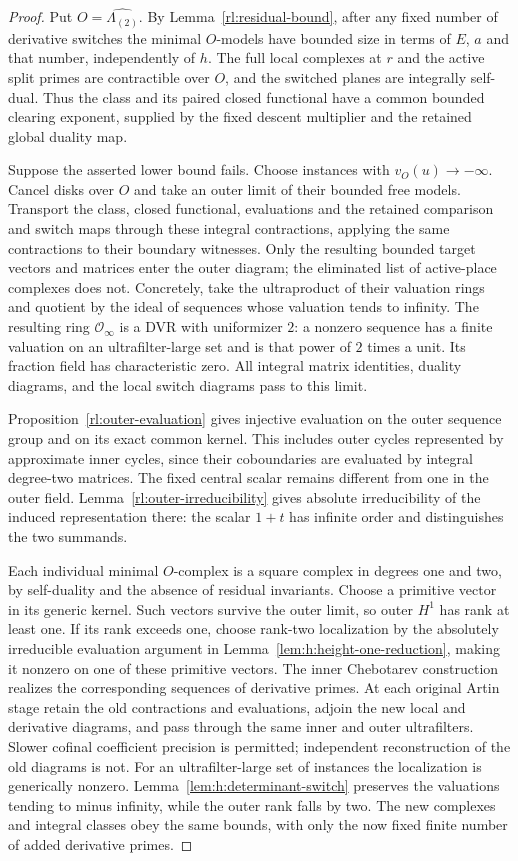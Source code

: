 \begin{proof}
Put $O=\widehat{\Lambda_{(2)}}$. By
Lemma~\ref{rl:residual-bound}, after any fixed number of derivative
switches the minimal $O$-models have bounded size in terms of $E$, $a$
and that number, independently of $h$. The full local complexes at
$r$ and the active split primes are contractible over $O$, and the
switched planes are integrally self-dual. Thus the class and its paired
closed functional have a common bounded clearing exponent, supplied by
the fixed descent multiplier and the retained global duality map.

Suppose the asserted lower bound fails. Choose instances with
$v_O(u)\to-\infty$. Cancel disks over $O$ and take an outer limit of
their bounded free models. Transport the class, closed functional,
evaluations and the retained comparison and switch maps through these
integral contractions, applying the same contractions to their boundary
witnesses. Only the resulting bounded target vectors and matrices enter
the outer diagram; the eliminated list of active-place complexes does
not. Concretely, take the ultraproduct of their
valuation rings and quotient by the ideal of sequences whose valuation
tends to infinity. The resulting ring $\mathcal O_\infty$ is a DVR
with uniformizer $2$: a nonzero sequence has a finite valuation on an
ultrafilter-large set and is that power of $2$ times a unit. Its
fraction field has characteristic zero. All integral matrix identities,
duality diagrams, and the local switch diagrams pass to this limit.

Proposition~\ref{rl:outer-evaluation} gives injective evaluation
on the outer sequence group and on its exact common kernel. This
includes outer cycles represented by approximate inner cycles, since
their coboundaries are evaluated by integral degree-two matrices.
The fixed central scalar remains different from one in the outer
field. Lemma~\ref{rl:outer-irreducibility} gives absolute irreducibility
of the induced representation there: the scalar $1+t$ has infinite
order and distinguishes the two summands.

Each individual minimal $O$-complex is a square complex in degrees
one and two, by self-duality and the absence of residual invariants.
Choose a primitive vector in its generic kernel. Such vectors survive
the outer limit, so outer $H^1$ has rank at least one. If its rank exceeds
one, choose rank-two localization by the absolutely irreducible
evaluation argument in Lemma~\ref{lem:h:height-one-reduction}, making
it nonzero on one of these primitive vectors. The inner Chebotarev construction realizes the corresponding
sequences of derivative primes. At each original Artin stage retain
the old contractions and evaluations, adjoin the new local and
derivative diagrams, and pass through the same inner and outer
ultrafilters. Slower cofinal coefficient precision is permitted;
independent reconstruction of the old diagrams is not. For an ultrafilter-large set of instances the localization is
generically nonzero. Lemma~\ref{lem:h:determinant-switch} preserves
the valuations tending to minus infinity, while the outer rank falls
by two. The new complexes and integral classes obey the same bounds,
with only the now fixed finite number of added derivative primes.


\end{proof}
